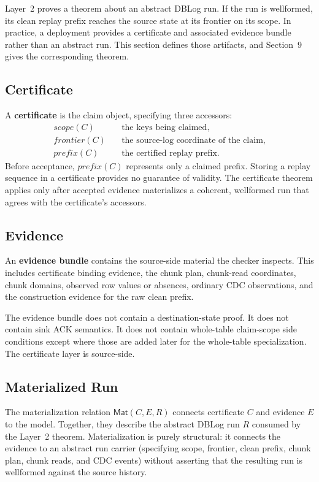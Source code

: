 \documentclass[letterpaper,10pt,twocolumn]{article}
\newcommand{\Scope}{\mathit{scope}}
\newcommand{\Frontier}{\mathit{frontier}}
\newcommand{\CleanPrefix}{\mathit{prefix}}
\newcommand{\Mat}{\mathsf{Mat}}
\begin{document}
Layer~2 proves a theorem about an abstract DBLog run. If the run is
wellformed, its clean replay prefix reaches the source state at its
frontier on its scope. In practice, a deployment provides a certificate and associated evidence
bundle rather than an abstract run. This section defines those artifacts,
and Section~9 gives the corresponding theorem.

\subsection{Certificate}\label{certificate}

A \textbf{certificate} is the claim object, specifying three accessors:
\[
  \begin{aligned}
    \Scope(C)\quad        &\text{the keys being claimed},\\
    \Frontier(C)\quad      &\text{the source-log coordinate of the claim},\\
    \CleanPrefix(C)\quad   &\text{the certified replay prefix.}
  \end{aligned}
\]
Before acceptance, $\CleanPrefix(C)$ represents only a claimed prefix.
Storing a replay sequence in a certificate provides no guarantee of
validity. The certificate theorem applies only after accepted
evidence materializes a coherent, wellformed run that agrees with the
certificate's accessors.

\subsection{Evidence}\label{evidence}

An \textbf{evidence bundle} contains the source-side material the
checker inspects. This includes certificate binding evidence, the chunk plan,
chunk-read coordinates, chunk domains, observed row values or absences,
ordinary CDC observations, and the construction evidence for the raw
clean prefix.

The evidence bundle does not contain a destination-state proof. It does
not contain sink ACK semantics. It does not contain whole-table
claim-scope side conditions except where those are added later for the
whole-table specialization. The certificate layer is source-side.

\subsection{Materialized Run}\label{materialized-run}

The materialization relation $\Mat(C,E,R)$ connects certificate $C$ and
evidence $E$ to the model. Together, they describe the abstract DBLog
run $R$ consumed by the Layer~2 theorem. Materialization is
purely structural: it connects the evidence to an abstract run carrier
(specifying scope, frontier, clean prefix, chunk plan, chunk reads, and
CDC events) without asserting that the resulting run is wellformed
against the source history.
\end{document}
